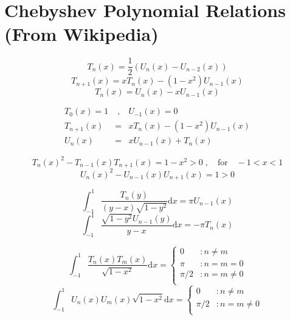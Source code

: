 \documentclass[a4paper,10pt]{article}
\newcommand{\D}{\mathrm{d}}
\begin{document}
\newpage
\appendix

\section{Chebyshev Polynomial Relations (From Wikipedia)}

\begin{equation}
  T_n(x) = \frac{1}{2} ( U_n(x) - U_{n-2}(x) )
\end{equation}
\begin{equation}
  T_{n+1}(x) = xT_n(x) - (1-x^2)U_{n-1}(x)
\end{equation}
\begin{equation}
  T_n(x) = U_n(x) - xU_{n-1}(x)
\end{equation}

\begin{eqnarray}
 T_0(x) = 1 & \;, &  U_{-1}(x) = 0 \nonumber \\
 T_{n+1}(x) & = & xT_n(x) - (1-x^2)U_{n-1}(x) \nonumber \\
 U_n(x) & = & xU_{n-1}(x) + T_n(x)
\end{eqnarray}

\begin{equation}
  T_n(x)^2 - T_{n-1}(x)T_{n+1}(x) = 1-x^2 > 0 \;, \quad \mbox{for} \quad -1 < x < 1
\end{equation}
\begin{equation}
  U_n(x)^2 - U_{n-1}(x)U_{n+1}(x) = 1 > 0
\end{equation}

\begin{equation}
  \int_{-1}^{1} \frac{T_n(y)}{(y-x) \sqrt{1-y^2} } \D x = \pi U_{n-1}(x)
\end{equation}
\begin{equation}
  \int_{-1}^{1} \frac{ \sqrt{1-y^2} U_{n-1}(y) }{ y-x} \D x = -\pi T_n(x)
\end{equation}

\begin{equation}
  \int_{-1}^{1} \frac{T_n(x)T_m(x)}{\sqrt{1-x^2}} \D x = 
    \begin{cases}
      0 & :n \ne m \\
      \pi & : n = m = 0 \\
      \pi/2 & : n = m \ne 0 \\
    \end{cases}
\end{equation}
\begin{equation}
  \int_{-1}^{1} U_n(x)U_m(x) \sqrt{1-x^2} \D x = 
    \begin{cases}
      0 & :n \ne m \\
      \pi/2 & : n = m \ne 0 \\
    \end{cases} 
\end{equation}
\end{document}
